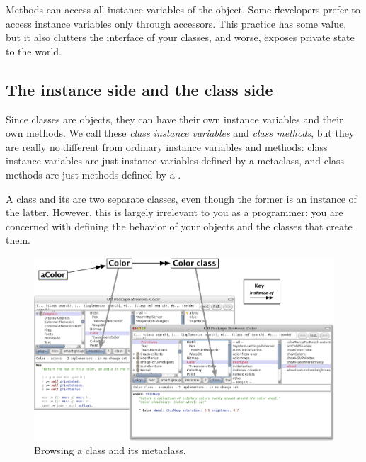 \documentclass[a4paper,10pt,twoside]{book}
\begin{document}
Methods can access all instance variables of the object.
Some \st developers prefer to access instance variables only through accessors.
This practice has some value, but it also clutters the interface of your classes, and worse, exposes private state to the world.

\subsection{The instance side and the class side}

Since classes are objects, they can have their own instance variables and their own methods.
We call these \emph{class instance variables} and \emph{class methods}, but they are really no different from ordinary instance variables and methods:
class instance variables are just instance variables defined by a metaclass, and class methods are just methods defined by a . 

A class and its  are two separate classes, even though the former is an instance of the latter. 
However, this is largely irrelevant to you as a programmer: you are concerned with defining the behavior of your objects and the classes that create them.

\begin{figure}[htb]
\begin{center}
\includegraphics[width=\textwidth]{Color-Buttons}
\caption{Browsing a class and its metaclass.
}
\end{center}
\end{figure}
\end{document}
